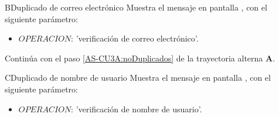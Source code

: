 
\begin{UCtrayectoriaA}{B}{Duplicado de correo electrónico}
	\UCpaso Muestra el mensaje en pantalla 
	, con el siguiente parámetro:
	\begin{itemize}
		\item $OPERACION$: 'verificación de correo electrónico'.
	\end{itemize}
	
	\UCpaso Continúa con el paso \ref{AS-CU3A:noDuplicados} de la 
	trayectoria alterna \textbf{A}.
\end{UCtrayectoriaA}


\begin{UCtrayectoriaA}{C}{Duplicado de nombre de usuario}
	\UCpaso Muestra el mensaje  en pantalla 
	, con el siguiente parámetro:
	\begin{itemize}
		\item $OPERACION$: 'verificación de nombre de usuario'.
	\end{itemize}
	
\end{UCtrayectoriaA}
